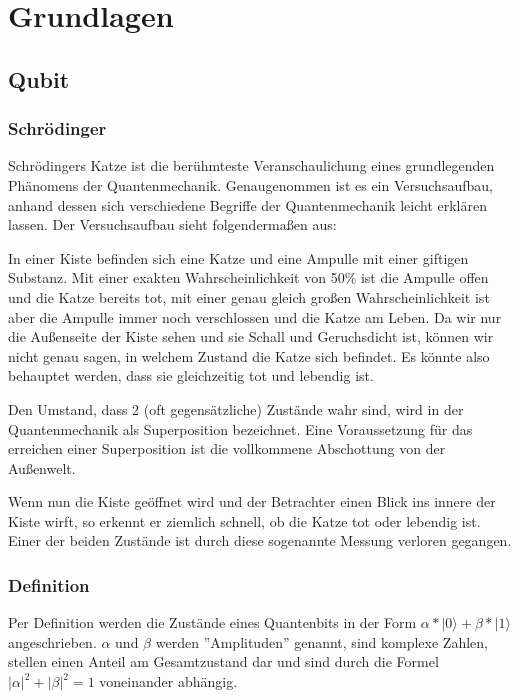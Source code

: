 
\section{Grundlagen}
\label{sec:grundlagen}

\subsection{Qubit}
\label{sec:qubit}

\subsubsection{Schrödinger}
\label{sec:schrodinger}

Schrödingers Katze ist die berühmteste Veranschaulichung eines grundlegenden Phänomens der Quantenmechanik. Genaugenommen ist es ein Versuchsaufbau, anhand dessen sich verschiedene Begriffe der Quantenmechanik leicht erklären lassen. Der Versuchsaufbau sieht folgendermaßen aus:

In einer Kiste befinden sich eine Katze und eine Ampulle mit einer giftigen Substanz. Mit einer exakten Wahrscheinlichkeit von 50\% ist die Ampulle offen und die Katze bereits tot, mit einer genau gleich großen Wahrscheinlichkeit ist aber die Ampulle immer noch verschlossen und die Katze am Leben. Da wir nur die Außenseite der Kiste sehen und sie Schall und Geruchsdicht ist, können wir nicht genau sagen, in welchem Zustand die Katze sich befindet. Es könnte also behauptet werden, dass sie gleichzeitig tot und lebendig ist.

Den Umstand, dass 2 (oft gegensätzliche) Zustände wahr sind, wird in der Quantenmechanik als Superposition bezeichnet. Eine Voraussetzung für das erreichen einer Superposition ist die vollkommene Abschottung von der Außenwelt. 

Wenn nun die Kiste geöffnet wird und der Betrachter einen Blick ins innere der Kiste wirft, so erkennt er ziemlich schnell, ob die Katze tot oder lebendig ist. Einer der beiden Zustände ist durch diese sogenannte Messung verloren gegangen.


\subsubsection{Definition}
\label{sec:Qubit_Definition}

Per Definition werden die Zustände eines Quantenbits in der Form $\alpha * |0\rangle + \beta * |1\rangle$ angeschrieben.
$\alpha$ und $\beta$ werden ''Amplituden'' genannt, sind komplexe Zahlen, stellen einen Anteil am Gesamtzustand dar und sind durch die Formel $|\alpha|^2 + |\beta|^2 = 1$ voneinander abhängig.

